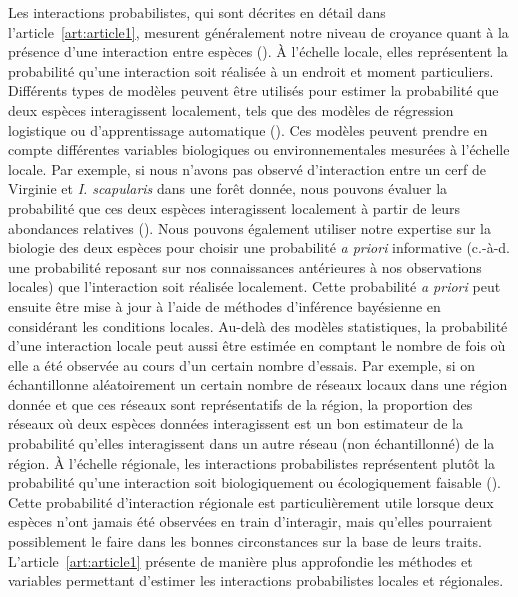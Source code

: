Les interactions probabilistes, qui sont décrites en détail dans
l'article~\ref{art:article1}, mesurent généralement notre niveau de croyance
quant à la présence d'une interaction entre espèces
(\cite{Poisot2016Structure}). À l'échelle locale, elles représentent la
probabilité qu'une interaction soit réalisée à un endroit et moment
particuliers. Différents types de modèles peuvent être utilisés pour estimer la
probabilité que deux espèces interagissent localement, tels que des modèles de
régression logistique ou d'apprentissage automatique
(\cite{Strydom2021Roadmapa}). Ces modèles peuvent prendre en compte différentes
variables biologiques ou environnementales mesurées à l'échelle locale. Par
exemple, si nous n'avons pas observé d'interaction entre un cerf de Virginie et
\textit{I. scapularis} dans une forêt donnée, nous pouvons évaluer la
probabilité que ces deux espèces interagissent localement à partir de leurs
abondances relatives (\cite{Canard2014Empirical}). Nous pouvons également
utiliser notre expertise sur la biologie des deux espèces pour choisir une
probabilité \textit{a priori} informative (c.-à-d. une probabilité reposant sur
nos connaissances antérieures à nos observations locales) que l'interaction soit
réalisée localement. Cette probabilité \textit{a priori} peut ensuite être mise
à jour à l'aide de méthodes d'inférence bayésienne en considérant les conditions
locales. Au-delà des modèles statistiques, la probabilité d'une interaction
locale peut aussi être estimée en comptant le nombre de fois où elle a été
observée au cours d'un certain nombre d'essais. Par exemple, si on échantillonne
aléatoirement un certain nombre de réseaux locaux dans une région donnée et que
ces réseaux sont représentatifs de la région, la proportion des réseaux où deux
espèces données interagissent est un bon estimateur de la probabilité qu'elles
interagissent dans un autre réseau (non échantillonné) de la région. À l'échelle
régionale, les interactions probabilistes représentent plutôt la probabilité
qu'une interaction soit biologiquement ou écologiquement faisable
(\cite{Strydom2023Grapha}). Cette probabilité d'interaction régionale est
particulièrement utile lorsque deux espèces n'ont jamais été observées en train
d'interagir, mais qu'elles pourraient possiblement le faire dans les bonnes
circonstances sur la base de leurs traits. L'article~\ref{art:article1} présente
de manière plus approfondie les méthodes et variables permettant d'estimer les
interactions probabilistes locales et régionales.


